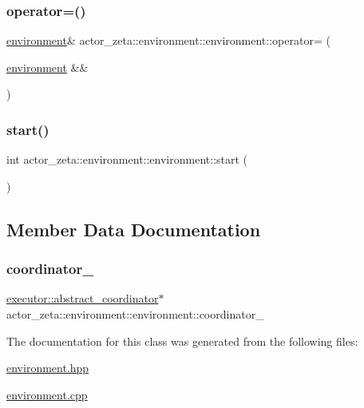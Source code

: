 \subsubsection{\texorpdfstring{operator=()}{operator=()}\hspace{0.1cm}{\footnotesize\ttfamily [2/2]}}
{\footnotesize\ttfamily \hyperlink{classactor__zeta_1_1environment_1_1environment}{environment}\& actor\+\_\+zeta\+::environment\+::environment\+::operator= (\begin{DoxyParamCaption}\item[{\hyperlink{classactor__zeta_1_1environment_1_1environment}{environment} \&\&}]{ }\end{DoxyParamCaption})\hspace{0.3cm}{\ttfamily [default]}}

\mbox{\label{classactor__zeta_1_1environment_1_1environment_a96929615c4a4acb6ce4aabe9a7a43db9}} 
\subsubsection{\texorpdfstring{start()}{start()}}
{\footnotesize\ttfamily int actor\+\_\+zeta\+::environment\+::environment\+::start (\begin{DoxyParamCaption}{ }\end{DoxyParamCaption})\hspace{0.3cm}{\ttfamily [virtual]}}



\subsection{Member Data Documentation}
\mbox{\label{classactor__zeta_1_1environment_1_1environment_a9c6ddfd97b9fa631d6c3a2385bec9581}} 
\subsubsection{\texorpdfstring{coordinator\+\_\+}{coordinator\_}}
{\footnotesize\ttfamily \hyperlink{classactor__zeta_1_1executor_1_1abstract__coordinator}{executor\+::abstract\+\_\+coordinator}$\ast$ actor\+\_\+zeta\+::environment\+::environment\+::coordinator\+\_\+\hspace{0.3cm}{\ttfamily [protected]}}



The documentation for this class was generated from the following files\+:\begin{DoxyCompactItemize}
\item 
\hyperlink{environment_8hpp}{environment.\+hpp}\item 
\hyperlink{environment_8cpp}{environment.\+cpp}\end{DoxyCompactItemize}
